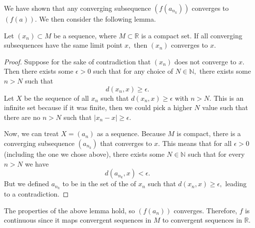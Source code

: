\documentclass{article}
\numberwithin{equation}{section}
\begin{document}
\begin{enumerate}
\begin{enumerate}[label=(\alph*)]
        We have shown that any converging subsequence $(f(a_{n_k}))$ converges to $(f(a)).$ We then consider the following lemma.
        \begin{lemma}
            Let $(x_n) \subset M$ be a sequence, where $M \subset \mathbb{R}$ is a compact set. If all converging subsequences have the same limit point $x,$ then $(x_n)$ converges to $x.$
            \begin{proof}
                Suppose for the sake of contradiction that $(x_n)$ does not converge to $x.$ Then there exists some $\epsilon > 0$ such that for any choice of $N\in \mathbb{N},$ there exists some $n>N$ such that 
                \begin{equation}
                    d(x_n,x) \ge \epsilon.
                \end{equation}
                Let $X$ be the sequence of all $x_n$ such that $d(x_n,x) \ge \epsilon$ with $n>N.$ This is an infinite set because if it was finite, then we could pick a higher $N$ value such that there are no $n>N$ such that $|x_n-x| \ge \epsilon.$
                
                Now, we can treat $X=(a_n)$ as a sequence. Because $M$ is compact, there is a converging subsequence $(a_{n_k})$ that converges to $x.$ This means that for all $\epsilon >0$ (including the one we chose above), there exists some $N\in \mathbb{N}$ such that for every $n>N$ we have
                \begin{equation}
                    d(a_{n_k},x) < \epsilon.
                \end{equation}
                But we defined $a_{n_k}$ to be in the set of the of $x_n$ such that $d(x_n,x) \ge \epsilon,$ leading to a contradiction.
            \end{proof}
        \end{lemma}
        The properties of the above lemma hold, so $(f(a_n))$ converges. Therefore, $f$ is continuous since it maps convergent sequences in $M$ to convergent sequences in $\mathbb{R}.$




\end{enumerate}
\end{enumerate}
\end{document}

